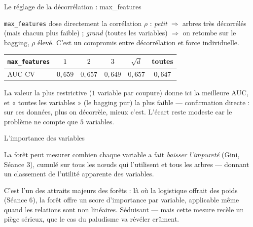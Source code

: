 \documentclass[aspectratio=169,11pt]{beamer}
\begin{document}
\begin{frame}{Le réglage de la décorrélation : max\_features}
\begin{ucaddef}
{\small \texttt{max\_features} dose directement la corrélation $\rho$ : \emph{petit} $\Rightarrow$ arbres très décorrélés (mais chacun plus faible) ; \emph{grand} (toutes les variables) $\Rightarrow$ on retombe sur le bagging, $\rho$ élevé. C'est un compromis entre décorrélation et force individuelle.}
\end{ucaddef}
\begin{ucadex}
{\small \begin{center}\renewcommand{\arraystretch}{1.1}\begin{tabular}{l|ccccc}
\texttt{max\_features} & $1$ & $2$ & $3$ & $\sqrt{d}$ & toutes\\\hline
AUC CV & $0{,}659$ & $0{,}657$ & $0{,}649$ & $0{,}657$ & $0{,}647$\\
\end{tabular}\end{center}
La valeur la plus restrictive ($1$ variable par coupure) donne ici la meilleure AUC, et « toutes les variables » (le bagging pur) la plus faible — confirmation directe : sur ces données, plus on décorrèle, mieux c'est. L'écart reste modeste car le problème ne compte que $5$ variables.}
\end{ucadex}
\end{frame}

\begin{frame}{L'importance des variables}
\begin{ucaddef}
{\small La forêt peut mesurer combien chaque variable a fait \emph{baisser l'impureté} (Gini, Séance 3), cumulé sur tous les nœuds qui l'utilisent et tous les arbres — donnant un classement de l'utilité apparente des variables.}
\end{ucaddef}
{\small C'est l'un des attraits majeurs des forêts : là où la logistique offrait des poids (Séance 6), la forêt offre un score d'importance par variable, applicable même quand les relations sont non linéaires. Séduisant — mais cette mesure recèle un piège sérieux, que le cas du paludisme va révéler crûment.}
\end{frame}
\end{document}
